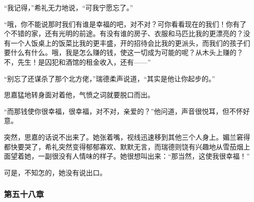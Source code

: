 \par “我记得，”希礼无力地说，“可我宁愿忘了。”
\par “哦，你不能说那时我们有谁是幸福的吧，对不对？可你看看现在的我们！你有了个不错的家，还有光明的前途。有没有谁的房子、衣服和马匹比我的更漂亮的？没有一个人饭桌上的饭菜比我的更丰盛，开的招待会比我的更派头，而我们的孩子们要什么有什么。哦，我是怎么赚的钱，使这一切成为可能的呢？从木头上赚的？不，先生！是囚犯和酒馆的租金收入，还有——”
\par “别忘了还谋杀了那个北方佬，”瑞德柔声说道，“其实是他让你起步的。”
\par 思嘉猛地转身面对着他，气愤之词就要脱口而出。
\par “而那钱使你很幸福，很幸福，对不对，亲爱的？”他问道，声音很悦耳，但不怀好意。
\par 突然，思嘉的话说不出来了。她张着嘴，视线迅速移到其他三个人身上。媚兰窘得都快要哭了，希礼突然变得郁郁寡欢、默默无言，而瑞德则饶有兴趣地从雪茄烟上面望着她，一副很没有人情味的样子。她很想叫出来：“那当然，这使我很幸福！”
\par 可是，不知怎的，她没有说出口。

\subsubsection{第五十八章}

